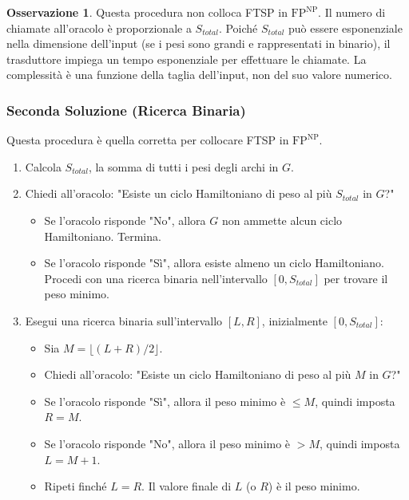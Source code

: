 \documentclass[a4paper]{article}
\theoremstyle{definition} %
\newtheorem{remark}{Osservazione}
\begin{document}
\begin{remark}
Questa procedura non colloca FTSP in $\text{FP}^{\text{NP}}$. Il numero di chiamate all'oracolo è proporzionale a $S_{total}$. Poiché $S_{total}$ può essere esponenziale nella dimensione dell'input (se i pesi sono grandi e rappresentati in binario), il trasduttore impiega un tempo esponenziale per effettuare le chiamate. La complessità è una funzione della taglia dell'input, non del suo valore numerico.
\end{remark}

\subsubsection{Seconda Soluzione (Ricerca Binaria)}
Questa procedura è quella corretta per collocare FTSP in $\text{FP}^{\text{NP}}$.

\begin{enumerate}
    \item Calcola $S_{total}$, la somma di tutti i pesi degli archi in $G$.
    \item Chiedi all'oracolo: "Esiste un ciclo Hamiltoniano di peso al più $S_{total}$ in $G$?"
    \begin{itemize}
        \item Se l'oracolo risponde "No", allora $G$ non ammette alcun ciclo Hamiltoniano. Termina.
        \item Se l'oracolo risponde "Sì", allora esiste almeno un ciclo Hamiltoniano. Procedi con una ricerca binaria nell'intervallo $[0, S_{total}]$ per trovare il peso minimo.
    \end{itemize}
    \item Esegui una ricerca binaria sull'intervallo $[L, R]$, inizialmente $[0, S_{total}]$:
    \begin{itemize}
        \item Sia $M = \lfloor (L+R)/2 \rfloor$.
        \item Chiedi all'oracolo: "Esiste un ciclo Hamiltoniano di peso al più $M$ in $G$?"
        \item Se l'oracolo risponde "Sì", allora il peso minimo è $\le M$, quindi imposta $R = M$.
        \item Se l'oracolo risponde "No", allora il peso minimo è $> M$, quindi imposta $L = M+1$.
        \item Ripeti finché $L=R$. Il valore finale di $L$ (o $R$) è il peso minimo.
    \end{itemize}
\end{enumerate}
\end{document}
